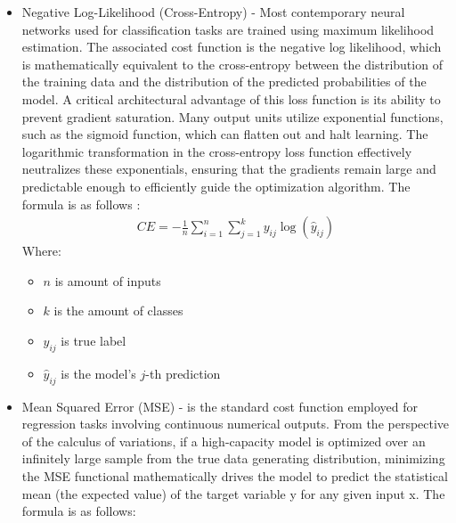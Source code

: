 \begin{itemize}
	\item Negative Log-Likelihood (Cross-Entropy) - Most contemporary neural networks used for classification tasks are trained using maximum likelihood estimation. The associated cost function is the negative log likelihood, which is mathematically equivalent to the cross-entropy between the distribution of the training data and the distribution of the predicted probabilities of the model. A critical architectural advantage of this loss function is its ability to prevent gradient saturation. Many output units utilize exponential functions, such as the sigmoid function, which can flatten out and halt learning. The logarithmic transformation in the cross-entropy loss function effectively neutralizes these exponentials, ensuring that the gradients remain large and predictable enough to efficiently guide the optimization algorithm. The formula is as follows \cite{Deep-Learning-book}:
\begin{align}
	CE = -\frac{1}{n} \sum_{i=1}^{n} \sum_{j=1}^{k} y_{ij} \log(\hat{y}_{ij})
\end{align}
	Where:
	\begin{itemize}
		\item $n$ is amount of inputs
		\item $k$ is the amount of classes
		\item $y_{ij}$ is true label
		\item $\hat{y}_{ij}$ is the model's $j$-th prediction
	\end{itemize}
	\item Mean Squared Error (MSE) - is the standard cost function employed for regression tasks involving continuous numerical outputs. From the perspective of the calculus of variations, if a high-capacity model is optimized over an infinitely large sample from the true data generating distribution, minimizing the MSE functional mathematically drives the model to predict the statistical mean (the expected value) of the target variable y for any given input x. The formula is as follows:

\end{itemize}
